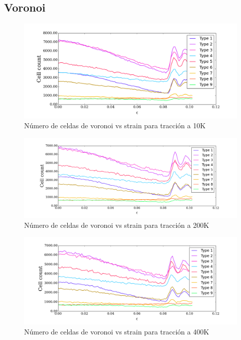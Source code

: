 \documentclass[10pt, oneside]{article} %
\begin{document}
\subsection{Voronoi}

\begin{figure}[H]
\centering
\includegraphics[width=15cm]{Figures/NanoParticles/voro_all_10K.png}
\caption{Número de celdas de voronoi vs strain para tracción a 10K}
\end{figure}

\begin{figure}[H]
\centering
\includegraphics[width=15cm]{Figures/NanoParticles/voro_all_200K.png}
\caption{Número de celdas de voronoi vs strain para tracción a 200K}
\end{figure}

\begin{figure}[H]
\centering
\includegraphics[width=15cm]{Figures/NanoParticles/voro_all_400K.png}
\caption{Número de celdas de voronoi vs strain para tracción a 400K}
\end{figure}
\end{document}

